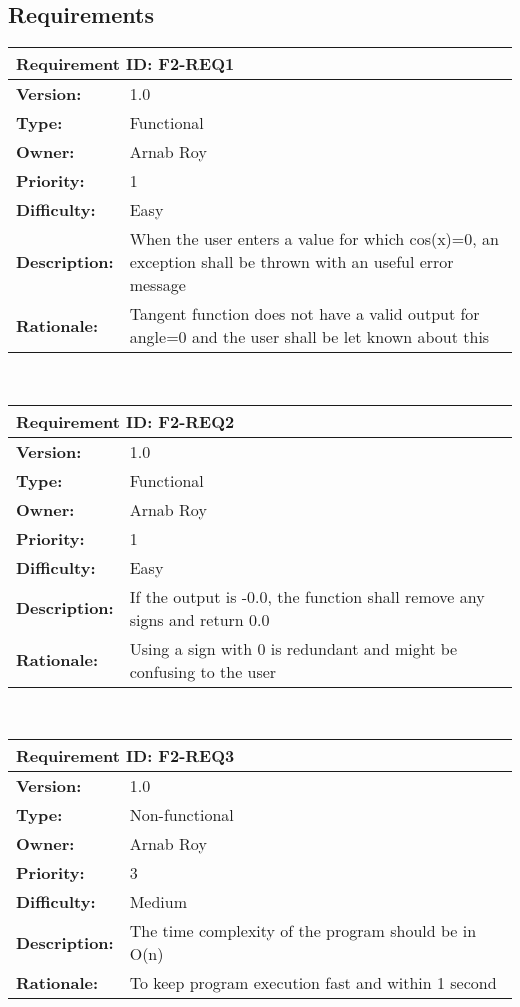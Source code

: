 \documentclass[12pt]{article}
\begin{document}
\subsection{Requirements}
\begin{tabular}{ |p{4cm} | p{10cm}| }
 \hline
 \multicolumn{2}{|l|}{\textbf{Requirement ID: F2-REQ1}} \\
 \hline
 \textbf{Version:} & 1.0\\
 \textbf{Type:} & Functional\\
 \textbf{Owner:} & Arnab Roy\\
 \textbf{Priority:} & 1\\
 \textbf{Difficulty:} & Easy\\
 \textbf{Description:} & When the user enters a value for which cos(x)=0, an exception shall be thrown with an useful error message \\
 \textbf{Rationale:} & Tangent function does not have a valid output for angle=0 and the user shall be let known about this\\
 \hline
\end{tabular}
\\[10pt]
\begin{tabular}{ |p{4cm} | p{10cm}| }
 \hline
 \multicolumn{2}{|l|}{\textbf{Requirement ID: F2-REQ2}} \\
 \hline
 \textbf{Version:} & 1.0\\
 \textbf{Type:} & Functional\\
 \textbf{Owner:} & Arnab Roy\\
 \textbf{Priority:} & 1\\
 \textbf{Difficulty:} & Easy\\
 \textbf{Description:} & If the output is -0.0, the function shall remove any signs and return 0.0 \\
 \textbf{Rationale:} & Using a sign with 0 is redundant and might be confusing to the user\\
 \hline
\end{tabular}
\\[10pt]
\begin{tabular}{ |p{4cm} | p{10cm}| }
 \hline
 \multicolumn{2}{|l|}{\textbf{Requirement ID: F2-REQ3}} \\
 \hline
 \textbf{Version:} & 1.0\\
 \textbf{Type:} & Non-functional\\
 \textbf{Owner:} & Arnab Roy\\
 \textbf{Priority:} & 3\\
 \textbf{Difficulty:} & Medium\\
 \textbf{Description:} & The time complexity of the program should be in O(n) \\
 \textbf{Rationale:} & To keep program execution fast and within 1 second\\
 \hline
\end{tabular}
\end{document}
